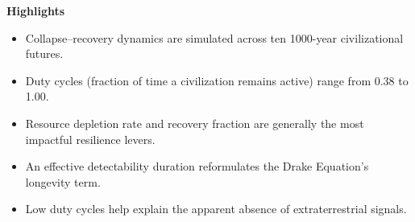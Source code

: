 \documentclass[11pt]{article}
\begin{document}
\begin{center}
\Large\textbf{Highlights}
\end{center}

\begin{itemize}[leftmargin=*, labelsep=1em, itemsep=0.5em]
\item Collapse--recovery dynamics are simulated across ten 1000-year civilizational futures.
\item Duty cycles (fraction of time a civilization remains active) range from 0.38 to 1.00.
\item Resource depletion rate and recovery fraction are generally the most impactful resilience levers.
\item An effective detectability duration reformulates the Drake Equation's longevity term.
\item Low duty cycles help explain the apparent absence of extraterrestrial signals.
\end{itemize}
\end{document}
